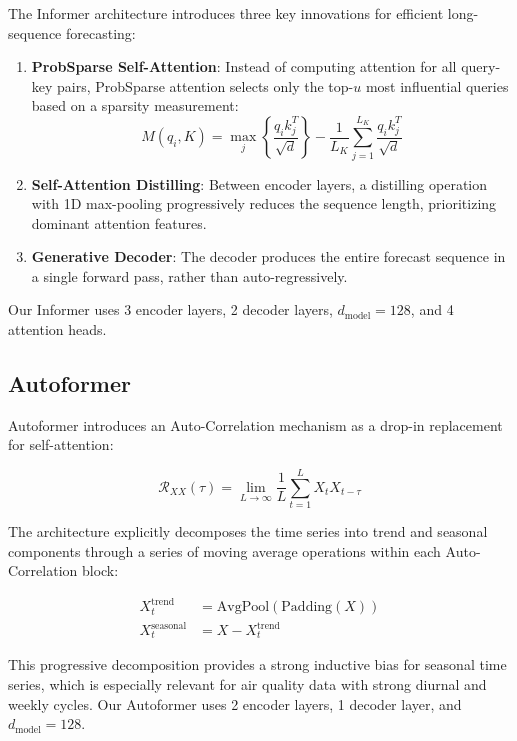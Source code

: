 The Informer architecture introduces three key innovations for efficient long-sequence forecasting:

\begin{enumerate}
    \item \textbf{ProbSparse Self-Attention}: Instead of computing attention for all query-key pairs, ProbSparse attention selects only the top-$u$ most influential queries based on a sparsity measurement:
    \begin{equation}
        M(q_i, K) = \max_j \left\{\frac{q_i k_j^T}{\sqrt{d}}\right\} - \frac{1}{L_K} \sum_{j=1}^{L_K} \frac{q_i k_j^T}{\sqrt{d}}
    \end{equation}
    
    \item \textbf{Self-Attention Distilling}: Between encoder layers, a distilling operation with 1D max-pooling progressively reduces the sequence length, prioritizing dominant attention features.
    
    \item \textbf{Generative Decoder}: The decoder produces the entire forecast sequence in a single forward pass, rather than auto-regressively.
\end{enumerate}

Our Informer uses 3 encoder layers, 2 decoder layers, $d_{\text{model}} = 128$, and 4 attention heads.

\subsection{Autoformer}

Autoformer introduces an Auto-Correlation mechanism as a drop-in replacement for self-attention:

\begin{equation}
    \mathcal{R}_{XX}(\tau) = \lim_{L \to \infty} \frac{1}{L} \sum_{t=1}^{L} X_t X_{t - \tau}
\end{equation}

The architecture explicitly decomposes the time series into trend and seasonal components through a series of moving average operations within each Auto-Correlation block:

\begin{align}
    X_t^{\text{trend}} &= \text{AvgPool}(\text{Padding}(X)) \\
    X_t^{\text{seasonal}} &= X - X_t^{\text{trend}}
\end{align}

This progressive decomposition provides a strong inductive bias for seasonal time series, which is especially relevant for air quality data with strong diurnal and weekly cycles. Our Autoformer uses 2 encoder layers, 1 decoder layer, and $d_{\text{model}} = 128$.

